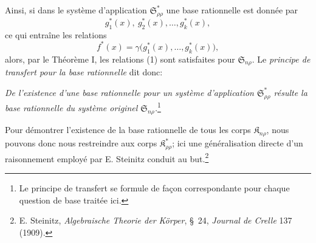 \documentclass[11pt]{article}
\providecommand{\Kfield}{\mathfrak{K}}
\providecommand{\Ssys}{\mathfrak{S}}
\begin{document}
Ainsi, si dans le système d'application $\Ssys^*_{\rho\rho}$ une base rationnelle est donnée par
\[
  g_1^*(x),\ g_2^*(x),\ldots,g_k^*(x),
\]
ce qui entraîne les relations
\[
  f^*(x)=\gamma\bigl(g_1^*(x),\ldots,g_k^*(x)\bigr),
\]
alors, par le Théorème I, les relations (1) sont satisfaites pour $\Ssys_{n\rho}$. Le \emph{principe de transfert pour la base rationnelle} dit donc:

\emph{De l'existence d'une base rationnelle pour un système d'application $\Ssys^*_{\rho\rho}$ résulte la base rationnelle du système originel $\Ssys_{n\rho}$.}\footnote{Le principe de transfert se formule de façon correspondante pour chaque question de base traitée ici.}

Pour démontrer l'existence de la base rationnelle de tous les corps $\Kfield_{n\rho}$, nous pouvons donc nous restreindre aux corps $\Kfield^*_{\rho\rho}$; ici une généralisation directe d'un raisonnement employé par E. Steinitz conduit au but.\footnote{E. Steinitz, \emph{Algebraische Theorie der Körper}, \S\ 24, \emph{Journal de Crelle} 137 (1909).}
\end{document}
